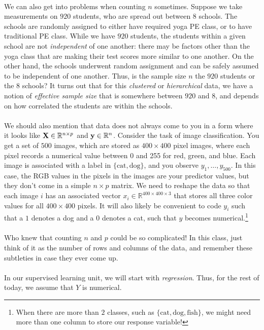 \documentclass[titlepage,10pt]{scrartcl}
\begin{document}
\\
We can also get into problems when counting $n$ sometimes. Suppose we take measurements on $920$ students, who are spread out between $8$ schools. The schools are randomly assigned to either have required yoga PE class, or to have traditional PE class.  While we have $920$ students, the students within a given school are not \emph{independent} of one another: there may be factors other than the yoga class that are making their test scores more similar to one another. On the other hand, the schools underwent random assignment and can be safely assumed to be independent of one another. Thus, is the sample size $n$ the $920$ students or the $8$ schools? It turns out that for this \emph{clustered} or \emph{hierarchical} data, we have a notion of \emph{effective sample size} that is somewhere between $920$ and $8$, and depends on how correlated the students are within the schools. \\
\\
We should also mention that data does not always come to you in a form where it looks like $\bold{X} \in \mathbb{R}^{n \times p}$ and $\bold{y} \in \mathbb{R}^n$. Consider the task of image classification. You get a set of $500$ images, which are stored as $400 \times 400$ pixel images, where each pixel records a numerical value between 0 and 255 for red, green, and blue. Each image is associated with a label in $\{\text{cat},  \text{dog}\}$, and you observe $y_1,\ldots, y_{500}$. In this case, the RGB values in the pixels in the images are your predictor values, but they don't come in a simple $n \times p$ matrix. We need to reshape the data so that each image $i$ has an associated vector $x_i \in \mathbb{R}^{400 \times 400 \times 3}$ that stores all three color values for all $400 \times 400$ pixels. It will also likely be convenient to code $y_i$ such that a $1$ denotes a dog and a $0$ denotes a cat, such that $y$ becomes numerical.\footnote{When there are more than $2$ classes, such as $\{\text{cat},  \text{dog}, \text{fish}\}$, we might need more than one column to store our response variable!} \\ 
\\
Who knew that counting $n$ and $p$ could be so complicated! In this class, just think of it as the number of rows and columns of the data, and remember these subtleties in case they ever come up. \\
\\
In our supervised learning unit, we will start with \emph{regression}. Thus, for the rest of today, we assume that $Y$ is numerical. 
\end{document}
